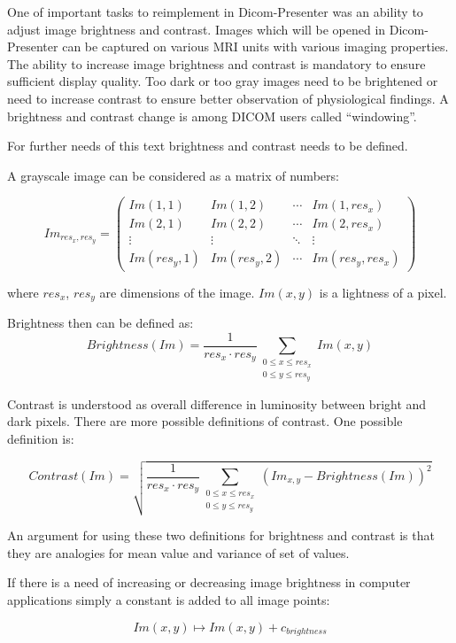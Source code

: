 One of important tasks to reimplement in Dicom-Presenter was an ability to adjust image brightness and contrast. Images which will be opened in Dicom-Presenter can be captured on various MRI units with various imaging properties. The ability to increase image brightness and contrast is mandatory to ensure sufficient display quality. Too dark or too gray images need to be brightened or need to increase contrast to ensure better observation of physiological findings. A brightness and contrast change is among DICOM users called ``windowing''.

For further needs of this text brightness and contrast needs to be defined. 

A grayscale image can be considered as a matrix of numbers: 

\[
 Im_{res_{x},res_{y}} =
 \begin{pmatrix}
  Im(1,1) & Im(1,2) & \cdots & Im(1,res_{x}) \\
  Im(2,1) & Im(2,2) & \cdots & Im(2,res_{x}) \\
  \vdots  & \vdots  & \ddots & \vdots  \\
  Im(res_{y},1) & Im(res_{y},2) & \cdots & Im(res_{y},res_{x})
 \end{pmatrix}
\]

where $ res_{x} $, $res_{y}$ are dimensions of the image. $Im(x,y)$ is a lightness of a pixel.

Brightness then can be defined as:
\[
  Brightness(Im) = \frac{1}{res_{x}  \cdot res_{y}}\sum_{\substack{0 \leq x \leq res_{x} \\ 0 \leq y \leq res_{y}}} Im(x,y)
\]

Contrast is understood as overall difference in luminosity between bright and dark pixels. There are more possible definitions of contrast. One possible definition is:

\[
Contrast(Im) = \sqrt{\frac{1}{res_{x} \cdot res_{y}}\sum_{\substack{ 0 \leq x \leq res_{x} \\ 0 \leq y \leq res_{y} }}(Im_{x,y}-Brightness(Im))^2}
\]

An argument for using these two definitions for brightness and contrast is that they are analogies for mean value and variance of set of values.

If there is a need of increasing or decreasing image brightness in computer applications simply a constant is added to all image points:

\begin{equation}
\label{brightness}
  Im(x,y) \longmapsto Im(x,y) + c_{brightness} 
\end{equation}

